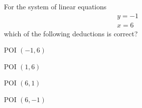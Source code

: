 \documentclass{webquiz}
\begin{document}
\begin{question} %
For the system of linear equations
\begin{gather*}
y=-1\\
x=6
\end{gather*}
which of the following deductions is correct?
\begin{choice}[columns=1] %
\incorrect \textsc{POI} $(-1,6)$

\incorrect \textsc{POI} $(1,6)$

\incorrect \textsc{POI} $(6,1)$

\correct \textsc{POI} $(6,-1)$
\end{choice}
\end{question}
\end{document}
